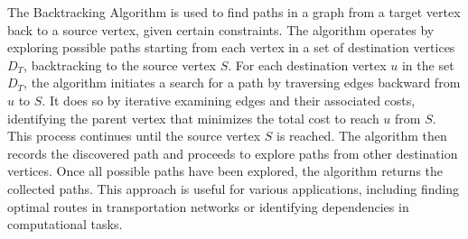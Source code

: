 The Backtracking Algorithm is used to find paths in a graph from a target vertex back to a source vertex, given certain constraints. The algorithm operates by exploring possible paths starting from each vertex in a set of destination vertices $D_T$, backtracking to the source vertex $S$. For each destination vertex $u$ in the set $D_T$, the algorithm initiates a search for a path by traversing edges backward from $u$ to $S$. It does so by iterative examining edges and their associated costs, identifying the parent vertex that minimizes the total cost to reach $u$ from $S$. This process continues until the source vertex $S$ is reached. The algorithm then records the discovered path and proceeds to explore paths from other destination vertices. Once all possible paths have been explored, the algorithm returns the collected paths. This approach is useful for various applications, including finding optimal routes in transportation networks or identifying dependencies in computational tasks.